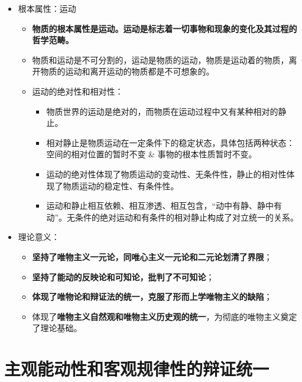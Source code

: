 \documentclass[
]{article}
\begin{document}
\begin{itemize}
\item
  根本属性：运动

  \begin{itemize}
  \item
    \textbf{物质的根本属性是运动。运动是标志着一切事物和现象的变化及其过程的哲学范畴。}
  \item
    物质和运动是不可分割的，运动是物质的运动，物质是运动着的物质，离开物质的运动和离开运动的物质都是不可想象的。
  \item
    运动的绝对性和相对性：

    \begin{itemize}
    \item
      物质世界的运动是绝对的，而物质在运动过程中又有某种相对的静止。
    \item
      相对静止是物质运动在一定条件下的稳定状态，具体包括两种状态：\\
      空间的相对位置的暂时不变 \& 事物的根本性质暂时不变。
    \item
      运动的绝对性体现了物质运动的变动性、无条件性，静止的相对性体现了物质运动的稳定性、有条件性。
    \item
      运动和静止相互依赖、相互渗透、相互包含，``动中有静、静中有动''。无条件的绝对运动和有条件的相对静止构成了对立统一的关系。
    \end{itemize}
  \end{itemize}
\item
  理论意义：

  \begin{itemize}
  \item
    \textbf{坚持了唯物主义一元论，同唯心主义一元论和二元论划清了界限}；
  \item
    \textbf{坚持了能动的反映论和可知论，批判了不可知论}；
  \item
    \textbf{体现了唯物论和辩证法的统一，克服了形而上学唯物主义的缺陷}；
  \item
    体现了\textbf{唯物主义自然观和唯物主义历史观的统一}，为彻底的唯物主义奠定了理论基础。
  \end{itemize}
\end{itemize}

\hypertarget{ux4e3bux89c2ux80fdux52a8ux6027ux548cux5ba2ux89c2ux89c4ux5f8bux6027ux7684ux8fa9ux8bc1ux7edfux4e00}{%
\section{主观能动性和客观规律性的辩证统一}\label{ux4e3bux89c2ux80fdux52a8ux6027ux548cux5ba2ux89c2ux89c4ux5f8bux6027ux7684ux8fa9ux8bc1ux7edfux4e00}}
\end{document}
